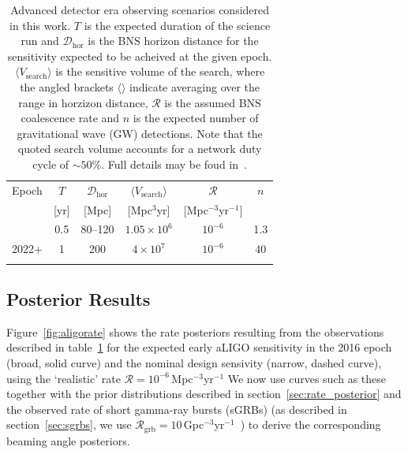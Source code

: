 \documentclass[twocolumn,nofootinbib]{revtex4-1}
\newcommand{\grbrate}{{{\mathcal R}_{\mathrm{grb}}}}
\newcommand{\cbcrate}{{{\mathcal R}}}
\newcommand{\dhor}{{\mathcal D}_{\mathrm{hor}}}
\def\gw#1{gravitational wave#1 (GW#1)\gdef\gw{GW}}
\def\sgrb#1{short gamma-ray burst#1 (sGRB#1)\gdef\sgrb{sGRB}}
\begin{document}
\begin{table}
\centering
\begin{tabular}{l c c c c c }
\toprule
Epoch & $T$ & $\dhor$ &
$\langle V_{\mathrm{search}}\rangle$ & $\cbcrate$ & $n$ \\
 & [yr] & [Mpc] & [Mpc$^3$yr] &  [Mpc$^{-3}$yr$^{-1}$] \\
\colrule
2016 & 0.5 & 80--120 & $1.05\times10^6$ & $10^{-6}$ & 1.3 \\
2022+ & 1 & 200 & $4\times10^7$ & $10^{-6}$ & 40 \\
\botrule
\end{tabular}
\caption{Advanced detector era observing scenarios considered in this work.  $T$
is the expected duration of the science run and $\dhor$ is the BNS
horizon distance for the sensitivity expected to be acheived at the given epoch.
$\langle V_{\mathrm{search}}\rangle $ is the sensitive volume of the search,
where the angled brackets $\langle \rangle$ indicate averaging over the range
in horzizon distance, $\cbcrate$ is the assumed BNS coalescence rate and
$n$ is the expected number of \gw{} detections.  Note that the
quoted search volume accounts for a network duty cycle of $\sim 50\%$.
Full details may be foud in~\cite{ade_prospects}.\label{table:scenarios}}
\end{table}
%

\subsection{Posterior Results}
Figure~\ref{fig:aligorate} shows the rate posteriors resulting from the
observations described in table~\ref{table:scenarios} for the expected early
aLIGO sensitivity in the 2016 epoch (broad, solid curve) and the nominal design
sensivity (narrow, dashed curve), using the `realistic' rate
$\cbcrate=10^{-6}$\,Mpc$^{-3}$yr$^{-1}$
We now use curves such as these together with the prior distributions described
in section~\ref{sec:rate_posterior} and the observed rate of \sgrb{s} (as
described in section~\ref{sec:sgrbs}, we use
$\grbrate=10$\,Gpc$^{-3}$yr$^{-1}$~\cite{nakar-2007,Dietz11}) to derive the
corresponding beaming angle posteriors.
\end{document}
